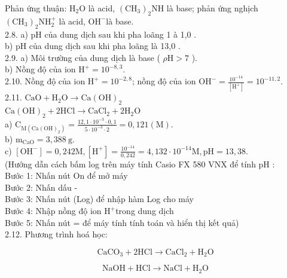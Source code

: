 \documentclass[10pt]{article}
\begin{document}
Phản ứng thuận: $\mathrm{H}_{2} \mathrm{O}$ là acid, $\left(\mathrm{CH}_{3}\right)_{2} \mathrm{NH}$ là base; phản ứng nghịch $\left(\mathrm{CH}_{3}\right)_{2} \mathrm{NH}_{2}^{+}$ là acid, $\mathrm{OH}^{-}$là base.\\
2.8. a) pH của dung dịch sau khi pha loãng 1 à 1,0 .\\
b) pH của dung dịch sau khi pha loãng là 13,0 .\\
2.9. a) Môi trường của dung dịch là base ( $\rho \mathrm{H}>7$ ).\\
b) Nồng độ của ion $\mathrm{H}^{+}=10^{-8,3}$.\\
2.10. Nồng độ của ion $\mathrm{H}^{+}=10^{-2,8}$; nồng độ của ion $\mathrm{OH}^{-}=\frac{10^{-14}}{\left[\mathrm{H}^{+}\right]}=10^{-11,2}$.\\
2.11. $\mathrm{CaO}+\mathrm{H}_{2} \mathrm{O} \longrightarrow \mathrm{Ca}(\mathrm{OH})_{2}$\\
$\mathrm{Ca}(\mathrm{OH})_{2}+2 \mathrm{HCl} \longrightarrow \mathrm{CaCl}_{2}+2 \mathrm{H}_{2} \mathrm{O}$\\
a) $\mathrm{C}_{\mathrm{M}\left(\mathrm{Ca}(\mathrm{OH})_{2}\right)}=\frac{12,1 \cdot 10^{-3} \cdot 0,1}{5 \cdot 10^{-3} \cdot 2}=0,121(\mathrm{M})$.\\
b) $\mathrm{m}_{\mathrm{CaO}}=3,388 \mathrm{~g}$.\\
c) $\left[\mathrm{OH}^{-}\right]=0,242 \mathrm{M},\left[\mathrm{H}^{+}\right]=\frac{10^{-14}}{0,242}=4,132 \cdot 10^{-14} \mathrm{M}, \mathrm{pH}=13,38$.\\
(Hướng dẫn cách bấm log trên máy tính Casio FX 580 VNX để tính pH :\\
Bước 1: Nhấn nút On để mở máy\\
Bước 2: Nhấn dấu -\\
Bước 3: Nhấn nút (Log) để nhập hàm Log cho máy\\
Bước 4: Nhập nồng độ ion $\mathrm{H}^{+}$trong dung dịch\\
Bước 5: Nhấn nút = để máy tính tính toán và hiển thị kết quả)\\
2.12. Phương trình hoá học:


\begin{equation*}
\mathrm{CaCO}_{3}+2 \mathrm{HCl} \longrightarrow \mathrm{CaCl}_{2}+\mathrm{H}_{2} \mathrm{O} \tag{1}
\end{equation*}



\begin{equation*}
\mathrm{NaOH}+\mathrm{HCl} \longrightarrow \mathrm{NaCl}+\mathrm{H}_{2} \mathrm{O} \tag{2}
\end{equation*}
\end{document}
